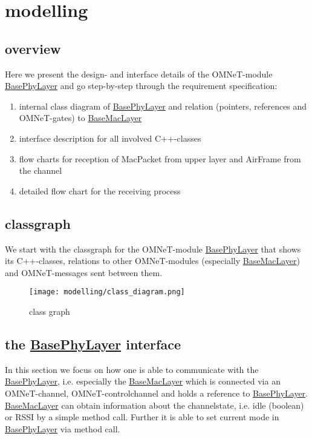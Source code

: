 \newcommand{\h}[1]{\underline{#1}}
\newcommand{\bp}{BasePhyLayer}
\newcommand{\bm}{BaseMacLayer}


\section{modelling}

\subsection{overview}

Here we present the design- and interface details of the OMNeT-module \h{\bp} and go step-by-step through the requirement specification:

\begin{enumerate}
 \item internal class diagram of \h{\bp} and relation (pointers, references and OMNeT-gates) to \h{\bm}
 \item interface description for all involved \textsf{C++}-classes
 \item flow charts for reception of MacPacket from upper layer and AirFrame from the channel
 \item detailed flow chart for the receiving process
\end{enumerate}

\subsection{classgraph}

We start with the classgraph for the OMNeT-module \h{\bp} that shows its
\textsf{C++}-classes, relations to other OMNeT-modules (especially \h{\bm})
and OMNeT-messages sent between them.

\begin{figure}[h]
 \centering
 \texttt{[image: modelling/class\_diagram.png]}
 \caption{class graph}
 \label{fig: classgraph}
\end{figure}

\subsection{the \h{\bp} interface}

In this section we focus on how one is able to communicate with the \h{\bp}, i.e. 
especially the \h{\bm} which is connected via an OMNeT-channel, OMNeT-controlchannel and holds a reference to \h{\bp}.
\h{\bm} can obtain information about the channelstate, i.e. idle (boolean) or RSSI by 
a simple method call. Further it is able to set current mode in \h{\bp} via method call.

